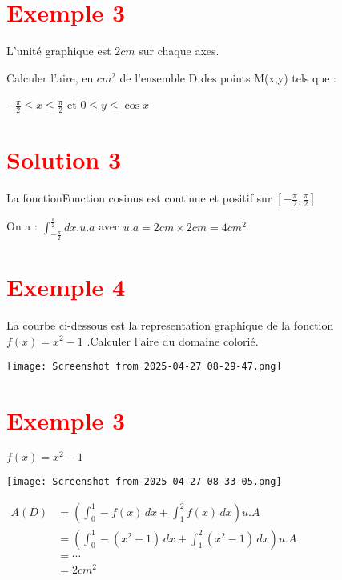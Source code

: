 \documentclass[12pt,a4paper]{article}
\begin{document}
\section*{\textbf{\textcolor{red}{Exemple 3}}}

L'unité graphique est $2cm$ sur chaque axes.

Calculer l'aire, en $cm^{2}$ de l'ensemble D des points M(x,y) tels que :

 \(-\frac{\pi}{2}\leq x \leq \frac{\pi}{2} \) et \( 0\leq y \leq \cos x \)

\section*{\textbf{\textcolor{red}{Solution 3}}}

La fonctionFonction cosinus est continue et positif sur \( \left[ -\frac{\pi}{2}, \frac{\pi}{2}\right]  \)

On a : $\int_{-\frac{\pi}{2}}^{\frac{\pi}{2}}dx.u.a$ avec $u.a = 2cm \times 2cm=4cm^{2}$

\section*{\textbf{\textcolor{red}{Exemple 4}}}

La courbe ci-dessous est la representation graphique de la fonction $f(x)=x^{2}-1$ .Calculer l'aire du domaine colorié.

\begin{center}
   \texttt{[image: Screenshot from 2025-04-27 08-29-47.png]}
\end{center}  

\section*{\textbf{\textcolor{red}{Exemple 3}}}

$f(x)=x^{2}-1$


\begin{center}
   \texttt{[image: Screenshot from 2025-04-27 08-33-05.png]}
\end{center}
\(
\begin{aligned}
A(D) &= \left( \int_0^1 -f(x) \, dx + \int_1^2 f(x) \, dx \right) u.A\\
		 &= \left( \int_0^1 -(x^{2}-1) \, dx + \int_1^2 (x^{2}-1) \, dx \right) u.A\\
		 &=\cdots\\
		 &=2cm^{2}
\end{aligned}
\)  
\end{document}
